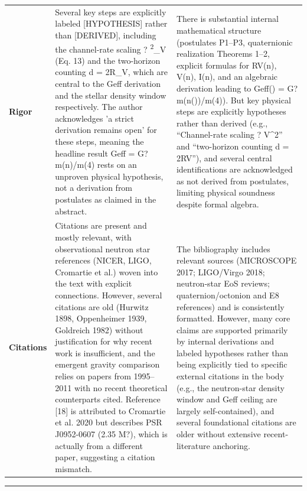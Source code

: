 \documentclass[11pt]{article}
\begin{document}
\begin{longtable}{@{} p{2.2cm} p{6.3cm} p{6.3cm} @{}}
\rowcolor{rowgray}
\textbf{Rigor} &
Several key steps are explicitly labeled [HYPOTHESIS] rather than [DERIVED], including the channel-rate scaling \textGamma{} ? \textomega{}\textsuperscript{2}\_V (Eq. 13) and the two-horizon counting d = 2R\_V, which are central to the Geff derivation and the stellar density window respectively. The author acknowledges 'a strict derivation remains open' for these steps, meaning the headline result Geff = G?\textomega{}m(n)/\textomega{}m(4) rests on an unproven physical hypothesis, not a derivation from postulates as claimed in the abstract. &
There is substantial internal mathematical structure (postulates P1--P3, quaternionic realization Theorems 1--2, explicit formulas for RV(n), \textomega{}V(n), I(n), and an algebraic derivation leading to Geff(\textrho{}) = G?\textomega{}m(n(\textrho{}))/\textomega{}m(4)). But key physical steps are explicitly hypotheses rather than derived (e.g., ``Channel-rate scaling \textGamma{} ? \textomega{}V\textasciicircum{}2'' and ``two-horizon counting d = 2RV''), and several central identifications are acknowledged as not derived from postulates, limiting physical soundness despite formal algebra. \\[6pt]

\textbf{Citations} &
Citations are present and mostly relevant, with observational neutron star references (NICER, LIGO, Cromartie et al.) woven into the text with explicit connections. However, several citations are old (Hurwitz 1898, Oppenheimer 1939, Goldreich 1982) without justification for why recent work is insufficient, and the emergent gravity comparison relies on papers from 1995--2011 with no recent theoretical counterparts cited. Reference [18] is attributed to Cromartie et al. 2020 but describes PSR J0952-0607 (2.35 M?), which is actually from a different paper, suggesting a citation mismatch. &
The bibliography includes relevant sources (MICROSCOPE 2017; LIGO/Virgo 2018; neutron-star EoS reviews; quaternion/octonion and E8 references) and is consistently formatted. However, many core claims are supported primarily by internal derivations and labeled hypotheses rather than being explicitly tied to specific external citations in the body (e.g., the neutron-star density window and Geff ceiling are largely self-contained), and several foundational citations are older without extensive recent-literature anchoring. \\

\end{longtable}

\bigskip
\hrule
\bigskip
\end{document}
